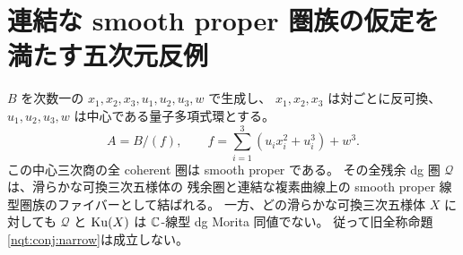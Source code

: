 \section{連結な smooth proper 圏族の仮定を満たす五次元反例}
\label{nfc:sec:counterexample}
\begin{theorem}\label{nfc:thm:counterexample}
$B$ を次数一の $x_1,x_2,x_3,u_1,u_2,u_3,w$ で生成し、
$x_1,x_2,x_3$ は対ごとに反可換、$u_1,u_2,u_3,w$ は中心である量子多項式環とする。
\[
 A=B/(f),\qquad f=\sum_{i=1}^3(u_i x_i^2+u_i^3)+w^3 .
\]
この中心三次商の全 coherent 圏は smooth proper である。
その全残余 dg 圏 $\mathcal Q$ は、滑らかな可換三次五様体の
残余圏と連結な複素曲線上の smooth proper 線型圏族のファイバーとして結ばれる。
一方、どの滑らかな可換三次五様体 $X$ に対しても
$\mathcal Q$ と $\operatorname{Ku}(X)$ は $\mathbb C$-線型 dg Morita 同値でない。
従って旧全称命題\ref{nqt:conj:narrow}は成立しない。
\end{theorem}

